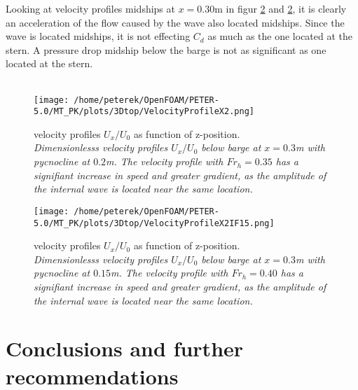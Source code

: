 \documentclass[a4paper, 12pt]{report}
\begin{document}
Looking at velocity profiles midships at $x=0.30$m in figur \ref{fig:velocityProfileX2If15} and \ref{fig:velocityProfileX2If15}, it is clearly an acceleration of the flow caused by the wave also located midships. Since the wave is located midships, it is not effecting $C_d$ as much as the one located at the stern. A pressure drop midship below the barge is not as significant as one located at the stern.
\\
\\
\begin{minipage}[t]{.45\textwidth} 
	\begin{figure}[H]
		\centering
		\texttt{[image: /home/peterek/OpenFOAM/PETER-5.0/MT\_PK/plots/3Dtop/VelocityProfileX2.png]}
		\caption{velocity profiles $U_x/U_0$ as function of z-position. \\ \textit{Dimensionlesss velocity profiles $U_x/U_0$ below barge at $x = 0.3$m with pycnocline at $0.2$m. The velocity profile with $Fr_h = 0.35$ has a signifiant increase in speed and greater gradient, as the amplitude of the internal wave is located near the same location.}}
		\label{fig:velocityProfileX2If2}
	\end{figure}
\end{minipage}\hfill
\vspace{2ex}
\begin{minipage}[t]{.45\textwidth}
	\begin{figure}[H]
		\centering
		\texttt{[image: /home/peterek/OpenFOAM/PETER-5.0/MT\_PK/plots/3Dtop/VelocityProfileX2IF15.png]}
		\caption{velocity profiles $U_x/U_0$ as function of z-position. \\ \textit{Dimensionlesss velocity profiles $U_x/U_0$ below barge at $x = 0.3$m with pycnocline at $0.15$m. The velocity profile with $Fr_h = 0.40$ has a signifiant increase in speed and greater gradient, as the amplitude of the internal wave is located near the same location.}}
		\label{fig:velocityProfileX2If15}
	\end{figure}
\end{minipage}\hfill
\vspace{2ex}

\chapter{Conclusions and further recommendations}
\end{document}
